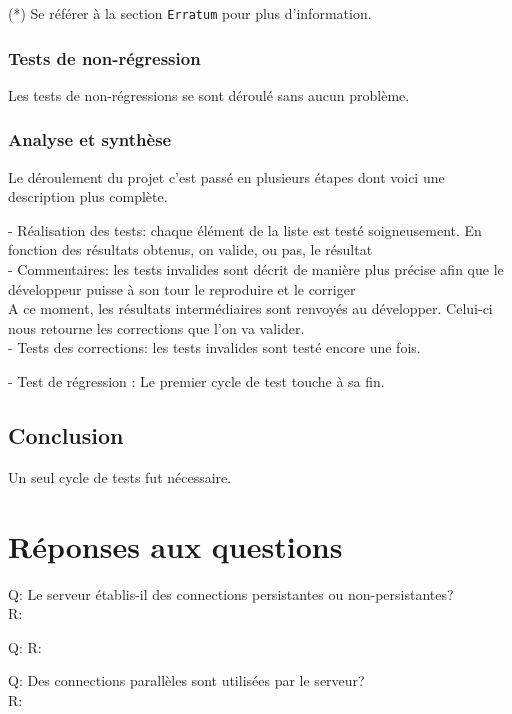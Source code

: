 \documentclass[a4paper, 11pt]{article}
\begin{document}
(*) Se référer à la section \texttt{Erratum} pour plus d'information.

\subsubsection{Tests de non-régression}

Les tests de non-régressions se sont déroulé sans aucun problème.

\subsubsection{Analyse et synthèse}

	Le déroulement du projet c'est passé en plusieurs étapes dont voici une description plus complète.
	
	- Réalisation des tests: chaque élément de la liste est testé soigneusement. En fonction des résultats obtenus, on valide, ou pas, le résultat \\
	
	- Commentaires: les tests invalides sont décrit de manière plus précise afin que le développeur puisse à son tour le reproduire et le corriger \\
	
	A ce moment, les résultats intermédiaires sont renvoyés au développer. Celui-ci nous retourne les corrections que l'on va valider. \\
	
	- Tests des corrections: les tests invalides sont testé encore une fois. 
	
	- Test de régression : Le premier cycle de test touche à sa fin.
	
\subsection{Conclusion}

Un seul cycle de tests fut nécessaire.

\section{Réponses aux questions}

	Q: Le serveur établis-il des connections persistantes ou non-persistantes? \\
	R: 
	
	Q:
	R:
	
	Q: Des connections parallèles sont utilisées par le serveur? \\
	R: 
	
\end{document}
